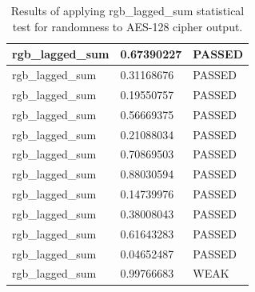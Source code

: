 \documentclass[conference]{IEEEtran}
\begin{document}
\begin{center}
\begin{table}[H]
\begin{tabular}{|l|l|l|}
rgb\_lagged\_sum                       & 0.67390227 & PASSED \\ \hline
rgb\_lagged\_sum                       & 0.31168676 & PASSED \\ \hline
rgb\_lagged\_sum                       & 0.19550757 & PASSED \\ \hline
rgb\_lagged\_sum                       & 0.56669375 & PASSED \\ \hline
rgb\_lagged\_sum                       & 0.21088034 & PASSED \\ \hline
rgb\_lagged\_sum                       & 0.70869503 & PASSED \\ \hline
rgb\_lagged\_sum                       & 0.88030594 & PASSED \\ \hline
rgb\_lagged\_sum                       & 0.14739976 & PASSED \\ \hline
rgb\_lagged\_sum                       & 0.38008043 & PASSED \\ \hline
rgb\_lagged\_sum                       & 0.61643283 & PASSED \\ \hline
rgb\_lagged\_sum                       & 0.04652487 & PASSED \\ \hline
rgb\_lagged\_sum                       & 0.99766683 & WEAK   \\ \hline
\end{tabular}
\caption{Results of applying rgb\_lagged\_sum statistical test for randomness to AES-128 cipher output.}
\label{dieharderesults2}
\end{table}
\end{center}
\end{document}
